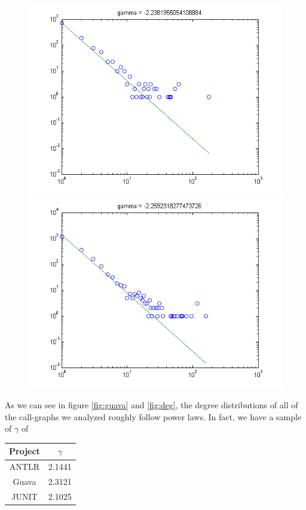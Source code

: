 \documentclass[11pt,a4paper,twocolumn]{article}
\begin{document}
\begin{singlespace}
\begin{figure}
\includegraphics[scale=0.5]{images/webmagic}
\includegraphics[scale=0.5]{images/xstream}
\end{figure}
As we can see in figure \ref{fig:guava} and \ref{fig:deg}, the degree distributions of
all of the call-graphs we analyzed roughly follow power laws. In fact, we have a sample of
$\gamma$ of
\begin{table}[H]
\centering
\begin{tabular}{|c|c|} \hline
Project & $\gamma$ \\ \hline
ANTLR & 2.1441 \\
Guava & 2.3121 \\
JUNIT & 2.1025 \\

\end{tabular}
\end{table}
\end{singlespace}
\end{document}
